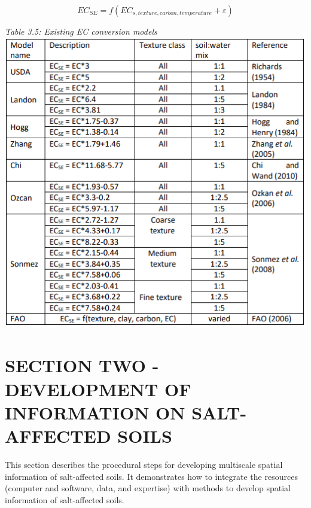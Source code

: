 \documentclass[
  10pt,
  b5paper,
]{book}
\begin{document}
\begin{equation}
\tag{3.1}
EC_{SE} = f(EC_{s,texture,carbon,temperature}+ \varepsilon )
\end{equation}

\emph{Table 3.5: Existing EC conversion models}\\
\includegraphics{figures/tables/Table_3.5.PNG}

\hypertarget{section-two---development-of-information-on-salt-affected-soils}{%
\chapter*{SECTION TWO - DEVELOPMENT OF INFORMATION ON SALT-AFFECTED SOILS}\label{section-two---development-of-information-on-salt-affected-soils}}

This section describes the procedural steps for developing multiscale spatial information of salt-affected soils. It demonstrates how to integrate the resources (computer and software, data, and expertise) with methods to develop spatial information of salt-affected soils.
\end{document}
